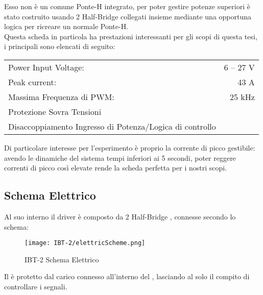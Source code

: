 \noindent
Esso non è un comune Ponte-H integrato, per poter gestire potenze superiori è stato costruito usando 2 Half-Bridge collegati insieme mediante una opportuna logica per ricreare un normale Ponte-H.\\
Questa scheda in particola ha prestazioni interessanti per gli scopi di questa tesi, i principali sono elencati di seguito:\vspace{-8mm}
\begin{center}
	\begin{tabular}[t]{|l r|}
		\hline
		Power Input Voltage:                                     & 6 -- 27 V \\
		Peak current:                                            & 43 A      \\
		Massima Frequenza di PWM:                                & 25 kHz    \\
		Protezione Sovra Tensioni                                &           \\
		Disaccoppiamento Ingresso di Potenza/Logica di controllo &           \\
		\hline
	\end{tabular}
\end{center}
\noindent
Di particolare interesse per l'esperimento è proprio la corrente di picco gestibile:
avendo le dinamiche del sistema tempi inferiori ai 5 secondi, poter reggere correnti di picco così elevate rende
la scheda perfetta per i nostri scopi.

\newpage
\subsection{Schema Elettrico}
Al suo interno il driver è composto da 2 Half-Bridge \cite{BTS7960b}, connesse secondo lo schema:
\begin{figure}[h]
	\centering
	\texttt{[image: IBT-2/elettricScheme.png]}
	\caption[IBT-2 Schema Elettrico]{IBT-2 Schema Elettrico}
\end{figure}\vspace{-5mm}

\noindent
Il \microC è protetto dal carico connesso all'interno del , lasciando al \microC solo il compito di controllare i segnali.


